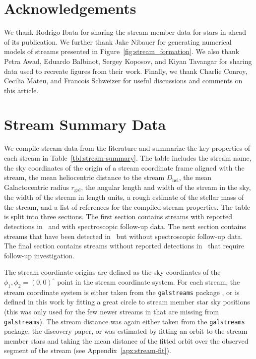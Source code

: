 \documentclass[final,5p,times,twocolumn,authoryear]{elsarticle}
\begin{document}
\section*{Acknowledgements}

We thank Rodrigo Ibata for sharing the stream member data for stars in
\citet{ibata:2023} ahead of its publication.
We further thank Jake Nibauer for generating numerical models of streams presented in Figure~\ref{fig:stream_formation}.
We also thank Petra Awad, Eduardo Balbinot, Sergey Koposov, and Kiyan Tavangar for
sharing data used to recreate figures from their work.
Finally, we thank Charlie Conroy, Cecilia Mateu, and Francois Schweizer
for useful discussions and comments on this article.


\appendix

\section{Stream Summary Data}
\label{apx:stream-summary}

We compile stream data from the literature and summarize the key properties of each
stream in Table~\ref{tbl:stream-summary}.
The table includes the stream name, the sky coordinates of the origin of a stream
coordinate frame aligned with the stream, the mean heliocentric distance to the stream
$D_\textrm{hel}$, the mean Galactocentric radius $r_{\textrm{gal}}$, the angular length
and width of the stream in the sky, the width of the stream in length units, a rough
estimate of the stellar mass of the stream, and a list of references for the compiled
stream properties.
The table is split into three sections.
The first section contains streams with reported detections in \gaia\ and with
spectroscopic follow-up data.
The next section contains streams that have been detected in \gaia\ but without
spectroscopic follow-up data.
The final section contains streams without reported detections in \gaia\ that require
follow-up investigation.

The stream coordinate origins are defined as the sky coordinates of the $\phi_1, \phi_2
= (0, 0)^\circ$ point in the stream coordinate system.
For each stream, the stream coordinate system is either taken from the
\texttt{galstreams} package \citep{mateu:2023}, or is defined in this work by fitting a
great circle to stream member star sky positions (this was only used for the few newer
streams in \citet{ibata:2023} that are missing from \texttt{galstreams}).
The stream distance was again either taken from the \texttt{galstreams} package, the
discovery paper, or was estimated by fitting an orbit to the stream member stars and
taking the mean distance of the fitted orbit over the observed segment of the stream
(see Appendix~\ref{apx:stream-fit}).
\end{document}
